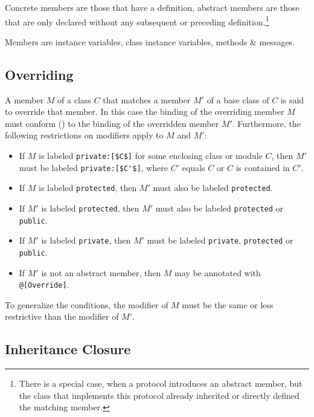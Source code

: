 Concrete members are those that have a definition, abstract members are those that are only declared without any subsequent or preceding definition.\footnote{There is a special case, when a protocol introduces an abstract member, but the class that implements this protocol already inherited or directly defined the matching member.}

Members are instance variables, class instance variables, methods \& messages. 


\subsection{Overriding}
\label{sec:overriding}

A member $M$ of a class $C$ that matches a member $M'$ of a base class of $C$ is said to override that member. In this case the binding of the overriding member $M$ must conform () to the binding of the overridden member $M'$. Furthermore, the following restrictions on modifiers apply to $M$ and $M'$: 
\begin{itemize}
\item If $M$ is labeled \lstinline!private:[$C$]! for some enclosing class or module $C$, then $M'$ must be labeled \lstinline!private:[$C'$]!, where $C'$ equals $C$ or $C$ is contained in $C'$. %
\item If $M$ is labeled \lstinline!protected!, then $M'$ must also be labeled \lstinline!protected!. 
\item If $M'$ is labeled \lstinline!protected!, then $M'$ must also be labeled \lstinline!protected! or \lstinline!public!. 
\item If $M'$ is labeled \lstinline!private!, then $M'$ must be labeled \lstinline!private!, \lstinline!protected! or \lstinline!public!. 
\item If $M'$ is not an abstract member, then $M$ may be annotated with \lstinline!@[Override]!. 
\end{itemize}

To generalize the conditions, the modifier of $M$ must be the same or less restrictive than the modifier of $M'$. 

\subsection{Inheritance Closure}
\label{sec:inheritance-closure}

\newcommand{\inheritclosure}{{\cal S}}

